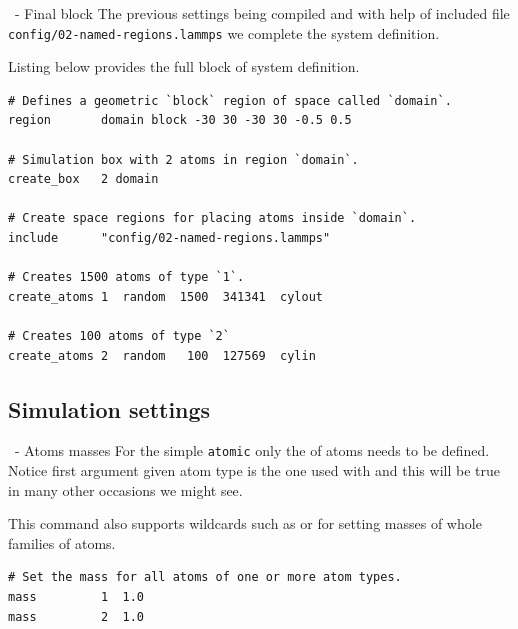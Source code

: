 \begin{frame}[fragile]{\secname}{\subsecname\ - Final block}
The previous settings being compiled and with help of included file \Verb|config/02-named-regions.lammps| we complete the system definition.

\vspace{0.5cm}
Listing below provides the full block of system definition.
\vspace{0.5cm}

\begin{lstlisting}[language=LAMMPS,basicstyle=\tiny]
# Defines a geometric `block` region of space called `domain`.
region       domain block -30 30 -30 30 -0.5 0.5

# Simulation box with 2 atoms in region `domain`.
create_box   2 domain

# Create space regions for placing atoms inside `domain`.
include      "config/02-named-regions.lammps"

# Creates 1500 atoms of type `1`.
create_atoms 1  random  1500  341341  cylout

# Creates 100 atoms of type `2`
create_atoms 2  random   100  127569  cylin
\end{lstlisting}
\end{frame}

\subsection{Simulation settings}

\begin{frame}[fragile]{\secname}{\subsecname\ - Atoms masses}
For the simple \Verb|atomic|  only the  of atoms needs to be defined. Notice first argument given atom type is the one used with  and this will be true in many other occasions we might see.

\vspace{0.5cm}

This command also supports wildcards such as  or  for setting masses of whole families of atoms.

\vspace{0.5cm}

\begin{lstlisting}[language=LAMMPS,basicstyle=\small]
# Set the mass for all atoms of one or more atom types.
mass         1  1.0
mass         2  1.0
\end{lstlisting}
\end{frame}

